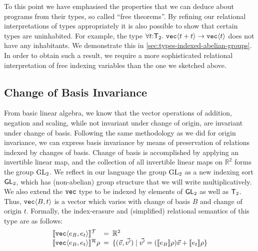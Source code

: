\begin{example}\label{ex:uninhabited-type}
  To this point we have emphasised the properties that we can deduce
  about programs from their types, so called ``free theorems''. By
  refining our relational interpretations of types appropriately it is
  also possible to show that certain types are uninhabited. For
  example, the type $\forall t \mathord: \mathsf{T}_2.\ \texttt{vec}\langle t
    + t \rangle \to \texttt{vec}\langle t \rangle$ does not have any inhabitants. We
  demonstrate this in \autoref{sec:types-indexed-abelian-groups}. In
  order to obtain such a result, we require a more sophisticated
  relational interpretation of free indexing variables than the one we
  sketched above.
\end{example}

\subsection{Change of Basis Invariance}
\label{sec:motivation-generalising}

From basic linear algebra, we know that the vector operations of
addition, negation and scaling, while not invariant under change of
origin, are invariant under change of basis. Following the same
methodology as we did for origin invariance, we can express basis
invariance by means of preservation of relations indexed by changes of
basis. Change of basis is accomplished by applying an invertible
linear map, and the collection of all invertible linear maps on
$\mathbb{R}^2$ forms the group $\mathrm{GL}_2$. We reflect in our language the
group $\mathrm{GL}_2$ as a new indexing sort $\mathsf{GL}_2$, which has
(non-abelian) group structure that we will write multiplicatively. We
also extend the $\texttt{vec}$ type to be indexed by elements of
$\mathsf{GL}_2$ as well as $\mathsf{T}_2$. Thus, $\texttt{vec}\langle B,t \rangle$ is a
vector which varies with change of basis $B$ and change of origin
$t$. Formally, the index-erasure and (simplified) relational semantics
of this type are as follows:
\begin{displaymath}
  \begin{array}{l@{\hspace{0.5em}=\hspace{0.5em}}l}
    \tySem{\tyPrim{vec}{e_B,e_t}} & \mathbb{R}^2 \\
    \rsem{\tyPrim{vec}{e_B,e_t}}{}\rho & \{ (\vec{v},\vec{v'}) \sepbar \vec{v'} = (\sem{e_B}\rho)\vec{v} + \sem{e_t}\rho \}
  \end{array}
\end{displaymath}

